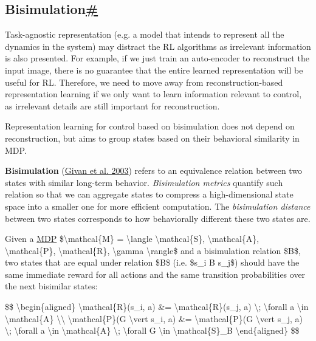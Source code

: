 \subsection{\texorpdfstring{Bisimulation\hyperref[bisimulation]{\#}}{Bisimulation\#}}\label{bisimulation}

Task-agnostic representation (e.g. a model that intends to represent all the dynamics in the system) may distract the RL algorithms as irrelevant information is also presented. For example, if we just train an auto-encoder to reconstruct the input image, there is no guarantee that the entire learned representation will be useful for RL. Therefore, we need to move away from reconstruction-based representation learning if we only want to learn information relevant to control, as irrelevant details are still important for reconstruction.

Representation learning for control based on bisimulation does not depend on reconstruction, but aims to group states based on their behavioral similarity in MDP.

\textbf{Bisimulation} (\href{http://citeseerx.ist.psu.edu/viewdoc/download?doi=10.1.1.61.2493&rep=rep1&type=pdf}{Givan et al. 2003}) refers to an equivalence relation between two states with similar long-term behavior. \emph{Bisimulation metrics} quantify such relation so that we can aggregate states to compress a high-dimensional state space into a smaller one for more efficient computation. The \emph{bisimulation distance} between two states corresponds to how behaviorally different these two states are.

Given a \href{https://lilianweng.github.io/posts/2018-02-19-rl-overview/\#markov-decision-processes}{MDP} \$\textbackslash mathcal\{M\} = \textbackslash langle \textbackslash mathcal\{S\}, \textbackslash mathcal\{A\}, \textbackslash mathcal\{P\}, \textbackslash mathcal\{R\}, \textbackslash gamma \textbackslash rangle\$ and a bisimulation relation \$B\$, two states that are equal under relation \$B\$ (i.e. \$s\_i B s\_j\$) should have the same immediate reward for all actions and the same transition probabilities over the next bisimilar states:

\$\$ \textbackslash begin\{aligned\} \textbackslash mathcal\{R\}(s\_i, a) \&= \textbackslash mathcal\{R\}(s\_j, a) \textbackslash; \textbackslash forall a \textbackslash in \textbackslash mathcal\{A\} \textbackslash\textbackslash{} \textbackslash mathcal\{P\}(G \textbackslash vert s\_i, a) \&= \textbackslash mathcal\{P\}(G \textbackslash vert s\_j, a) \textbackslash; \textbackslash forall a \textbackslash in \textbackslash mathcal\{A\} \textbackslash; \textbackslash forall G \textbackslash in \textbackslash mathcal\{S\}\_B \textbackslash end\{aligned\} \$\$

